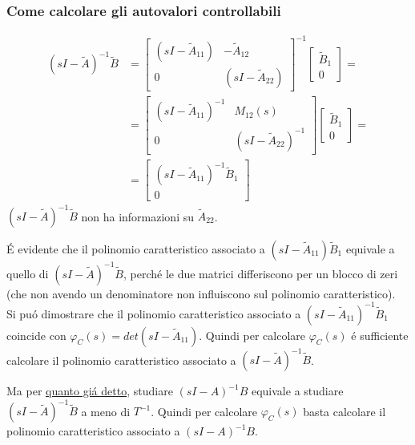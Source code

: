 \documentclass[../main.tex]{subfiles}
\begin{document}
	\subsubsection{Come calcolare gli autovalori controllabili}
		\begin{align*}
			(sI-\tilde A)^{-1} \tilde B &=
			\begin{bmatrix}
				(sI-\tilde A_{11}) & -\tilde A_{12}\\
				0 & (sI-\tilde A_{22})
			\end{bmatrix}^{-1}
			\begin{bmatrix}
				\tilde B_1\\
				0
			\end{bmatrix} =
			\\
			&= \begin{bmatrix}
				(sI-\tilde A_{11})^{-1} & M_{12}(s)\\
				0 & (sI-\tilde A_{22})^{-1}
			\end{bmatrix}
			\begin{bmatrix}
				\tilde B_1\\
				0
			\end{bmatrix} =
			\\
			&= \begin{bmatrix}
				(sI-\tilde A_{11})^{-1} \tilde B_1\\
				0
			\end{bmatrix}
		\end{align*}
		$ (sI-\tilde A)^{-1} \tilde B $ non ha informazioni su $ \tilde A_{22} $.
		
		\'E evidente che il polinomio caratteristico associato a $ (sI-\tilde A_{11}) \tilde B_1 $ equivale a quello di $ (sI - \tilde A)^{-1} \tilde B $, perch\'e le due matrici differiscono per un blocco di zeri (che non avendo un denominatore non influiscono sul polinomio caratteristico).\\
		Si pu\'o dimostrare che il polinomio caratteristico associato a $ (sI-\tilde A_{11})^{-1} \tilde B_1 $ coincide con $ \varphi_C(s) = det(sI-\tilde A_{11}) $. Quindi per calcolare $ \varphi_C(s) $ \'e sufficiente calcolare il polinomio caratteristico associato a $ (sI-\tilde A)^{-1} \tilde B $.
		
		Ma per \hyperref[sentece:calcolo-autovalori]{quanto gi\'a detto}, studiare $ (sI-A)^{-1} B $ equivale a studiare $ (sI-\tilde A)^{-1} \tilde B $ a meno di $ T^{-1} $. Quindi per calcolare $ \varphi_C(s) $ basta calcolare il polinomio caratteristico associato a $ (sI-A)^{-1} B $.
\end{document}
